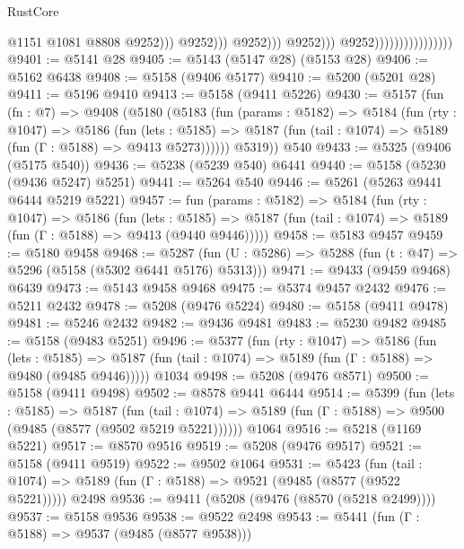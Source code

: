 \begin{lexlean}{RustCore}
\begin{coremodule}
                                                            @1151
                                                            @1081
                                                            @8808
                                                            @9252)))
                                                      @9252)))
                                                @9252)))
                                          @9252)))
                                    @9252))))))))))))))))
@9401 := @5141 @28
@9405 := @5143 (@5147 @28) (@5153 @28)
@9406 := @5162 @6438
@9408 := @5158 (@9406 @5177)
@9410 := @5200 (@5201 @28)
@9411 := @5196 @9410
@9413 := @5158 (@9411 @5226)
@9430 := @5157
    (fun (fn : @7) =>
    @9408
      (@5180
        (@5183
          (fun (params : @5182) =>
          @5184
            (fun (rty : @1047) =>
            @5186
              (fun (lets : @5185) =>
              @5187 (fun (tail : @1074) => @5189 (fun (Γ : @5188) => @9413 @5273))))))
        @5319))
    @540
@9433 := @5325 (@9406 (@5175 @540))
@9436 := @5238 (@5239 @540) @6441
@9440 := @5158 (@5230 (@9436 @5247) @5251)
@9441 := @5264 @540
@9446 := @5261 (@5263 @9441 @6444 @5219 @5221)
@9457 := fun (params : @5182) =>
  @5184
    (fun (rty : @1047) =>
    @5186
      (fun (lets : @5185) =>
      @5187 (fun (tail : @1074) => @5189 (fun (Γ : @5188) => @9413 (@9440 @9446)))))
@9458 := @5183 @9457
@9459 := @5180 @9458
@9468 := @5287 (fun (U : @5286) => @5288 (fun (t : @47) => @5296 (@5158 (@5302 @6441 @5176) @5313)))
@9471 := @9433 (@9459 @9468) @6439
@9473 := @5143 @9458 @9468
@9475 := @5374 @9457 @2432
@9476 := @5211 @2432
@9478 := @5208 (@9476 @5224)
@9480 := @5158 (@9411 @9478)
@9481 := @5246 @2432
@9482 := @9436 @9481
@9483 := @5230 @9482
@9485 := @5158 (@9483 @5251)
@9496 := @5377
    (fun (rty : @1047) =>
    @5186
      (fun (lets : @5185) =>
      @5187 (fun (tail : @1074) => @5189 (fun (Γ : @5188) => @9480 (@9485 @9446)))))
    @1034
@9498 := @5208 (@9476 @8571)
@9500 := @5158 (@9411 @9498)
@9502 := @8578 @9441 @6444
@9514 := @5399
    (fun (lets : @5185) =>
    @5187
      (fun (tail : @1074) => @5189 (fun (Γ : @5188) => @9500 (@9485 (@8577 (@9502 @5219 @5221))))))
    @1064
@9516 := @5218 (@1169 @5221)
@9517 := @8570 @9516
@9519 := @5208 (@9476 @9517)
@9521 := @5158 (@9411 @9519)
@9522 := @9502 @1064
@9531 := @5423
    (fun (tail : @1074) => @5189 (fun (Γ : @5188) => @9521 (@9485 (@8577 (@9522 @5221)))))
    @2498
@9536 := @9411 (@5208 (@9476 (@8570 (@5218 @2499))))
@9537 := @5158 @9536
@9538 := @9522 @2498
@9543 := @5441 (fun (Γ : @5188) => @9537 (@9485 (@8577 @9538)))

\end{coremodule}
\end{lexlean}

